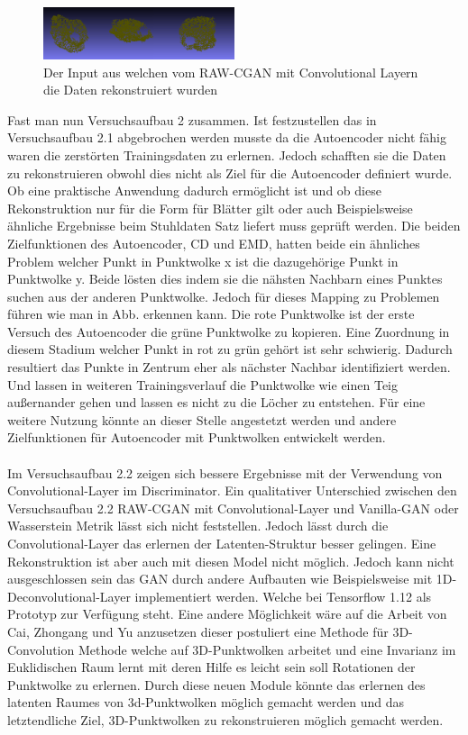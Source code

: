 \documentclass{llncs}
\begin{document}
\begin{figure}[htbp] 
	\centering
	\includegraphics[width=0.5\textwidth]{raw_cgan_ws_real.png}
	\caption{Der Input aus welchen vom RAW-CGAN mit Convolutional Layern die Daten rekonstruiert wurden}
	\label{fig:Bild83}
\end{figure}


Fast man nun Versuchsaufbau 2 zusammen. Ist festzustellen das in Versuchsaufbau 2.1 abgebrochen werden musste da die Autoencoder nicht fähig waren die zerstörten Trainingsdaten zu erlernen. Jedoch schafften sie die Daten zu rekonstruieren obwohl dies nicht als Ziel für die Autoencoder definiert wurde. Ob eine praktische Anwendung dadurch ermöglicht ist und ob diese Rekonstruktion nur für die Form für Blätter gilt oder auch Beispielsweise ähnliche Ergebnisse beim Stuhldaten Satz liefert muss geprüft werden. Die beiden Zielfunktionen des Autoencoder, CD und EMD, hatten beide ein ähnliches Problem welcher Punkt in Punktwolke x ist die dazugehörige Punkt in Punktwolke y. Beide lösten dies indem sie die nähsten Nachbarn eines Punktes suchen aus der anderen Punktwolke.  Jedoch für dieses Mapping zu Problemen führen wie man in Abb. erkennen kann. Die rote Punktwolke ist der erste Versuch des Autoencoder die grüne Punktwolke zu kopieren. Eine Zuordnung in diesem Stadium welcher Punkt in rot zu grün gehört ist sehr schwierig. Dadurch resultiert das Punkte in Zentrum eher als nächster Nachbar identifiziert werden. Und lassen in weiteren Trainingsverlauf die Punktwolke wie einen Teig außernander gehen und lassen es nicht zu die Löcher zu entstehen. Für eine weitere Nutzung könnte an dieser Stelle angestetzt werden und andere Zielfunktionen für Autoencoder mit Punktwolken entwickelt werden. 
\\\\
Im Versuchsaufbau 2.2 zeigen sich bessere Ergebnisse mit der Verwendung von Convolutional-Layer im Discriminator. Ein qualitativer Unterschied zwischen den Versuchsaufbau 2.2 RAW-CGAN mit Convolutional-Layer und Vanilla-GAN oder Wasserstein Metrik lässt sich nicht feststellen. Jedoch lässt durch die Convolutional-Layer das erlernen der Latenten-Struktur besser gelingen. Eine Rekonstruktion ist aber auch mit diesen Model nicht möglich. Jedoch kann nicht ausgeschlossen sein das GAN durch andere Aufbauten wie Beispielsweise mit 1D-Deconvolutional-Layer implementiert werden. Welche bei Tensorflow 1.12 als Prototyp zur Verfügung steht. Eine andere Möglichkeit wäre auf die Arbeit von Cai, Zhongang  und Yu \cite{3d-conv} anzusetzen dieser postuliert eine Methode für 3D-Convolution Methode welche auf 3D-Punktwolken arbeitet und eine Invarianz im Euklidischen Raum lernt mit deren Hilfe es leicht sein soll Rotationen der Punktwolke zu erlernen. Durch diese neuen Module könnte das erlernen des latenten Raumes von 3d-Punktwolken möglich gemacht werden und das letztendliche Ziel, 3D-Punktwolken zu rekonstruieren möglich gemacht werden. 
\newpage
\end{document}
